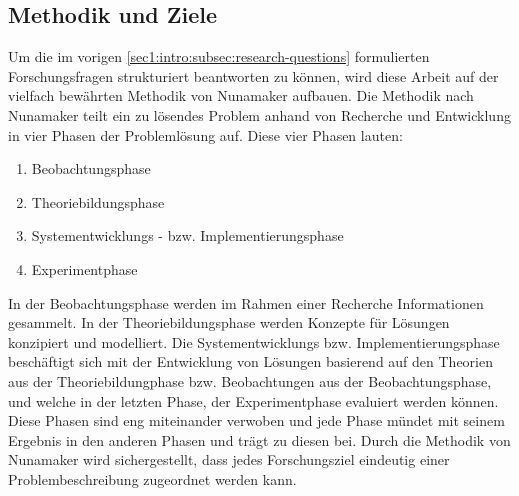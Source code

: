 \subsection{Methodik und Ziele}
\label{sec1:intro:subsec:methodology-goals}
Um die im vorigen \cref{sec1:intro:subsec:research-questions} formulierten Forschungsfragen strukturiert beantworten zu können, wird diese Arbeit auf der vielfach bewährten Methodik von Nunamaker \cite{nunamaker} aufbauen. Die Methodik nach Nunamaker teilt ein zu lösendes Problem anhand von Recherche und Entwicklung in vier Phasen der Problemlösung auf. Diese vier Phasen lauten:
\begin{enumerate}
    \setlength{\itemsep}{0pt}
    \item Beobachtungsphase
    \item Theoriebildungsphase
    \item Systementwicklungs - bzw. Implementierungsphase
    \item Experimentphase
\end{enumerate}

In der Beobachtungsphase werden im Rahmen einer Recherche Informationen gesammelt. 
In der Theoriebildungsphase werden Konzepte für Lösungen konzipiert und modelliert. 
Die Systementwicklungs bzw. Implementierungsphase beschäftigt sich mit der Entwicklung von Lösungen basierend auf den Theorien aus der Theoriebildungphase bzw. Beobachtungen aus der Beobachtungsphase, und welche in der letzten Phase, der Experimentphase evaluiert werden können. 
Diese Phasen sind eng miteinander verwoben und jede Phase mündet mit seinem Ergebnis in den anderen Phasen und trägt zu diesen bei. 
Durch die Methodik von Nunamaker wird sichergestellt, dass jedes Forschungsziel eindeutig einer Problembeschreibung zugeordnet werden kann.

